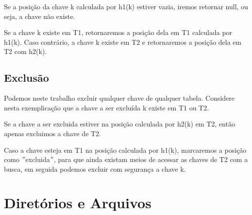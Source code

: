 \documentclass{article}
\begin{document}
            Se a posição da chave k calculada por h1(k) estiver vazia, iremos retornar null, ou seja, a chave não existe.

            Se a chave k existe em T1, retornaremos a posição dela em T1 calculada por h1(k).
            Caso contrário, a chave k existe em T2 e retornaremos a posição dela em T2 com h2(k).

        \subsection{Exclusão}\label{subsec:exclusao}

            Podemos neste trabalho excluir qualquer chave de qualquer tabela.
            Considere nesta exemplicação que a chave a ser excluída k existe em T1 ou T2.

            Se a chave a ser excluida estiver na posição calculada por h2(k) em T2, então apenas excluimos a chave de T2.

            Caso a chave esteja em T1 na posição calculada por h1(k), marcaremos a posição como \("\)excluida\("\), para que
            ainda existam meios de acessar as chaves de T2 com a busca, em seguida podemos excluir com segurança a chave k.

    \section{Diretórios e Arquivos}\label{sec:diretorios-e-arquivos}
\end{document}
